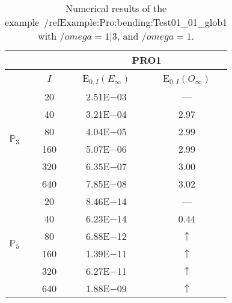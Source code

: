 \begin{table}[H]
\caption{Numerical results of the example~/ref{Example:Pro:bending:Test01_01_glob1} with $/omega=1|3$, and $/omega=1$.}
\setlength{\tabcolsep}{5pt}
\centering
\begin{tabular}{@{}l c c c@{}}
\toprule
 &  & \multicolumn{2}{c}{PRO1}\\
\midrule
 & $I$ & E$_{0,I}(E_{\infty})$ & E$_{0,I}(O_{\infty})$\\
\midrule
\multirow{6}{*}{$\mathbb{P}_{3}$}
 & 20 & 2.51E$-$03 & ---\\
 & 40 & 3.21E$-$04 & 2.97\\
 & 80 & 4.04E$-$05 & 2.99\\
 & 160 & 5.07E$-$06 & 2.99\\
 & 320 & 6.35E$-$07 & 3.00\\
 & 640 & 7.85E$-$08 & 3.02\\
\midrule
\multirow{6}{*}{$\mathbb{P}_{5}$}
 & 20 & 8.46E$-$14 & ---\\
 & 40 & 6.23E$-$14 & 0.44\\
 & 80 & 6.88E$-$12 & $\uparrow$\\
 & 160 & 1.39E$-$11 & $\uparrow$\\
 & 320 & 6.27E$-$11 & $\uparrow$\\
 & 640 & 1.88E$-$09 & $\uparrow$\\
\bottomrule
\end{tabular}
\label{Table:PRO:test_01_01_test10_pro1}
\end{table}
